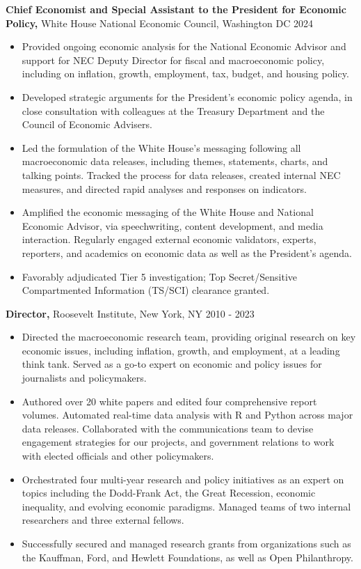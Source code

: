 \documentclass[11pt,]{article}
\begin{document}
\textbf{Chief Economist and Special Assistant to the President for
Economic Policy,} White House National Economic Council, Washington DC
\hfill 2024

\begin{itemize}
\item
  Provided ongoing economic analysis for the National Economic Advisor
  and support for NEC Deputy Director for fiscal and macroeconomic
  policy, including on inflation, growth, employment, tax, budget, and
  housing policy.
\item
  Developed strategic arguments for the President's economic policy
  agenda, in close consultation with colleagues at the Treasury
  Department and the Council of Economic Advisers.
\item
  Led the formulation of the White House's messaging following all
  macroeconomic data releases, including themes, statements, charts, and
  talking points. Tracked the process for data releases, created
  internal NEC measures, and directed rapid analyses and responses on
  indicators.
\item
  Amplified the economic messaging of the White House and National
  Economic Advisor, via speechwriting, content development, and media
  interaction. Regularly engaged external economic validators, experts,
  reporters, and academics on economic data as well as the President's
  agenda.
\item
  Favorably adjudicated Tier 5 investigation; Top Secret/Sensitive
  Compartmented Information (TS/SCI) clearance granted.
\end{itemize}

\textbf{Director,} Roosevelt Institute, New York, NY \hfill 2010 - 2023

\begin{itemize}
\item
  Directed the macroeconomic research team, providing original research
  on key economic issues, including inflation, growth, and employment,
  at a leading think tank. Served as a go-to expert on economic and
  policy issues for journalists and policymakers.
\item
  Authored over 20 white papers and edited four comprehensive report
  volumes. Automated real-time data analysis with R and Python across
  major data releases. Collaborated with the communications team to
  devise engagement strategies for our projects, and government
  relations to work with elected officials and other policymakers.
\item
  Orchestrated four multi-year research and policy initiatives as an
  expert on topics including the Dodd-Frank Act, the Great Recession,
  economic inequality, and evolving economic paradigms. Managed teams of
  two internal researchers and three external fellows.
\item
  Successfully secured and managed research grants from organizations
  such as the Kauffman, Ford, and Hewlett Foundations, as well as Open
  Philanthropy.
\end{itemize}
\end{document}
